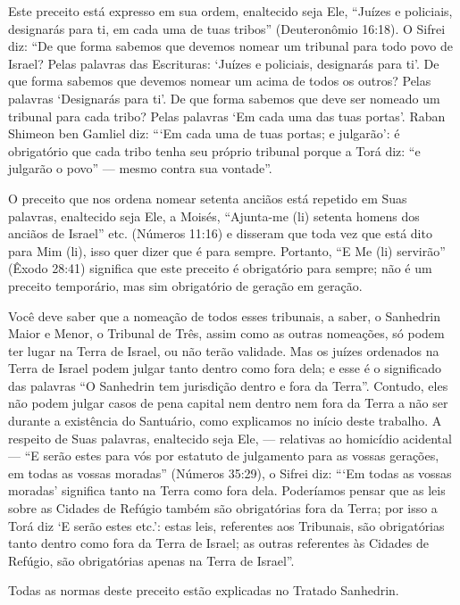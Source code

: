 Este preceito está expresso em sua ordem, enaltecido seja Ele, ``Juízes
e policiais, designarás para ti, em cada uma de tuas tribos''
(Deuteronômio 16:18). O Sifrei diz: ``De que forma sabemos que devemos
nomear um tribunal para todo povo de Israel? Pelas palavras das
Escrituras: `Juízes e policiais, designarás para ti'. De que forma
sabemos que devemos nomear um acima de todos os outros? Pelas palavras `Designarás para ti'. De que forma sabemos
que deve ser nomeado um tribunal para cada tribo? Pelas palavras `Em
cada uma das tuas portas'. Raban Shimeon ben Gamliel diz: ```Em cada uma
de tuas portas; e julgarão': é obrigatório que cada tribo tenha seu
próprio tribunal porque a Torá diz: ``e julgarão o povo'' --- mesmo
contra sua vontade''.

O preceito que nos ordena nomear setenta anciãos está repetido em Suas
palavras, enaltecido seja Ele, a Moisés, ``Ajunta-me (li) setenta homens
dos anciãos de Israel'' etc. (Números 11:16) e disseram que toda vez
que está dito para Mim (li), isso quer dizer que é para sempre.
Portanto, ``E Me (li) servirão'' (Êxodo 28:41) significa que este
preceito é obrigatório para sempre; não é um preceito temporário, mas
sim obrigatório de geração em geração.

Você deve saber que a nomeação de todos esses tribunais, a saber, o
Sanhedrin Maior e Menor, o Tribunal de Três, assim como as outras
nomeações, só podem ter lugar na Terra de Israel, ou não terão
validade. Mas os juízes ordenados na Terra de Israel podem julgar tanto
dentro como fora dela; e esse é o significado das palavras ``O Sanhedrin
tem jurisdição dentro e fora da Terra''. Contudo, eles não podem julgar
casos de pena capital nem dentro nem fora da Terra a não ser durante a
existência do Santuário, como explicamos no início deste trabalho. A
respeito de Suas palavras, enaltecido seja Ele, --- relativas ao
homicídio acidental --- ``E serão estes para vós por estatuto de
julgamento para as vossas gerações, em todas as vossas moradas''
(Números 35:29), o Sifrei diz: ```Em todas as vossas moradas' significa
tanto na Terra como fora dela. Poderíamos pensar que as leis sobre as
Cidades de Refúgio também são obrigatórias fora da Terra; por isso a
Torá diz `E serão estes etc.': estas leis, referentes aos Tribunais,
são obrigatórias tanto dentro como fora da Terra de Israel; as outras
referentes às Cidades de Refúgio, são obrigatórias apenas na Terra de
Israel''.

Todas as normas deste preceito estão explicadas no Tratado Sanhedrin.


